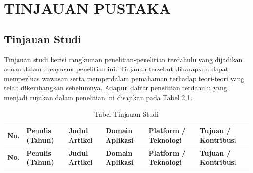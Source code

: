 \chapter{TINJAUAN PUSTAKA}


\section{Tinjauan Studi}
Tinjauan studi berisi rangkuman penelitian-penelitian terdahulu yang dijadikan acuan dalam menyusun penelitian ini. Tinjauan tersebut diharapkan dapat memperluas wawasan serta memperdalam pemahaman terhadap teori-teori yang telah dikembangkan sebelumnya. Adapun daftar penelitian terdahulu yang menjadi rujukan dalam penelitian ini disajikan pada Tabel 2.1.

\begin{landscape}
    \begin{longtable}{>{\raggedright\arraybackslash}p{0.5cm}
        >{\raggedright\arraybackslash}p{2.5cm}
        >{\raggedright\arraybackslash}p{3cm}
        >{\raggedright\arraybackslash}p{2.8cm}
        >{\raggedright\arraybackslash}p{3.5cm
        }
        >{\raggedright\arraybackslash}p{6.5cm}}

        \caption{Tabel Tinjauan Studi}                                                                                                                                                                                                                                                                                                                                                                                                                                                                             \\
        \hline
        \textbf{No.} & \textbf{Penulis (Tahun)} & \textbf{Judul Artikel}                                                                                        & \textbf{Domain Aplikasi}                     & \textbf{Platform / Teknologi}                                                                                & \textbf{Tujuan / Kontribusi}                                                                                                                                                       \\
        \hline
        \endfirsthead

        \hline
        \textbf{No.} & \textbf{Penulis (Tahun)} & \textbf{Judul Artikel}                                                                                        & \textbf{Domain Aplikasi}                     & \textbf{Platform / Teknologi}                                                                                & \textbf{Tujuan / Kontribusi}                                                                                                                                                       \\
        \hline
        \endhead


\end{longtable}
\end{landscape}
